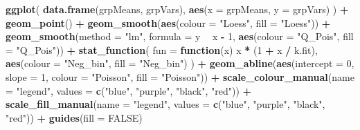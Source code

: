 \documentclass[
  12pt,
]{book}
\newenvironment{Shaded}{\begin{snugshade}}{\end{snugshade}}
\newcommand{\ControlFlowTok}[1]{\textcolor[rgb]{0.13,0.29,0.53}{\textbf{#1}}}
\newcommand{\DataTypeTok}[1]{\textcolor[rgb]{0.13,0.29,0.53}{#1}}
\newcommand{\DecValTok}[1]{\textcolor[rgb]{0.00,0.00,0.81}{#1}}
\newcommand{\KeywordTok}[1]{\textcolor[rgb]{0.13,0.29,0.53}{\textbf{#1}}}
\newcommand{\NormalTok}[1]{#1}
\newcommand{\OperatorTok}[1]{\textcolor[rgb]{0.81,0.36,0.00}{\textbf{#1}}}
\newcommand{\OtherTok}[1]{\textcolor[rgb]{0.56,0.35,0.01}{#1}}
\newcommand{\StringTok}[1]{\textcolor[rgb]{0.31,0.60,0.02}{#1}}
\begin{document}
\begin{Shaded}
\begin{Highlighting}[]
\KeywordTok{ggplot}\NormalTok{(}
  \KeywordTok{data.frame}\NormalTok{(grpMeans, grpVars),}
  \KeywordTok{aes}\NormalTok{(}\DataTypeTok{x =}\NormalTok{ grpMeans, }\DataTypeTok{y =}\NormalTok{ grpVars)}
\NormalTok{) }\OperatorTok{+}
\StringTok{  }\KeywordTok{geom_point}\NormalTok{() }\OperatorTok{+}
\StringTok{  }\KeywordTok{geom_smooth}\NormalTok{(}\KeywordTok{aes}\NormalTok{(}\DataTypeTok{colour =} \StringTok{"Loess"}\NormalTok{, }\DataTypeTok{fill =} \StringTok{"Loess"}\NormalTok{)) }\OperatorTok{+}
\StringTok{  }\KeywordTok{geom_smooth}\NormalTok{(}\DataTypeTok{method =} \StringTok{"lm"}\NormalTok{, }\DataTypeTok{formula =}\NormalTok{ y }\OperatorTok{~}\StringTok{ }\NormalTok{x }\OperatorTok{-}\StringTok{ }\DecValTok{1}\NormalTok{, }\KeywordTok{aes}\NormalTok{(}\DataTypeTok{colour =} \StringTok{"Q_Pois"}\NormalTok{, }\DataTypeTok{fill =} \StringTok{"Q_Pois"}\NormalTok{)) }\OperatorTok{+}
\StringTok{  }\KeywordTok{stat_function}\NormalTok{(}
    \DataTypeTok{fun =} \ControlFlowTok{function}\NormalTok{(x) x }\OperatorTok{*}\StringTok{ }\NormalTok{(}\DecValTok{1} \OperatorTok{+}\StringTok{ }\NormalTok{x }\OperatorTok{/}\StringTok{ }\NormalTok{k.fit),}
    \KeywordTok{aes}\NormalTok{(}\DataTypeTok{colour =} \StringTok{"Neg_bin"}\NormalTok{, }\DataTypeTok{fill =} \StringTok{"Neg_bin"}\NormalTok{)}
\NormalTok{  ) }\OperatorTok{+}
\StringTok{  }\KeywordTok{geom_abline}\NormalTok{(}\KeywordTok{aes}\NormalTok{(}\DataTypeTok{intercept =} \DecValTok{0}\NormalTok{, }\DataTypeTok{slope =} \DecValTok{1}\NormalTok{, }\DataTypeTok{colour =} \StringTok{"Poisson"}\NormalTok{, }\DataTypeTok{fill =} \StringTok{"Poisson"}\NormalTok{)) }\OperatorTok{+}
\StringTok{  }\KeywordTok{scale_colour_manual}\NormalTok{(}\DataTypeTok{name =} \StringTok{"legend"}\NormalTok{, }\DataTypeTok{values =} \KeywordTok{c}\NormalTok{(}\StringTok{"blue"}\NormalTok{, }\StringTok{"purple"}\NormalTok{, }\StringTok{"black"}\NormalTok{, }\StringTok{"red"}\NormalTok{)) }\OperatorTok{+}
\StringTok{  }\KeywordTok{scale_fill_manual}\NormalTok{(}\DataTypeTok{name =} \StringTok{"legend"}\NormalTok{, }\DataTypeTok{values =} \KeywordTok{c}\NormalTok{(}\StringTok{"blue"}\NormalTok{, }\StringTok{"purple"}\NormalTok{, }\StringTok{"black"}\NormalTok{, }\StringTok{"red"}\NormalTok{)) }\OperatorTok{+}
\StringTok{  }\KeywordTok{guides}\NormalTok{(}\DataTypeTok{fill =} \OtherTok{FALSE}\NormalTok{)}
\end{Highlighting}
\end{Shaded}
\end{document}
